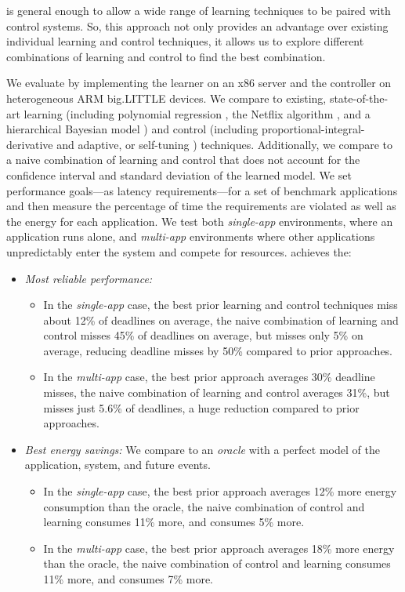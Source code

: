 \SYSTEM{} is general enough to allow a wide range of learning
techniques to be paired with control systems.  So, this approach not
only provides an advantage over existing individual learning and
control techniques, it allows us to explore different combinations of
learning and control to find the best combination.

We evaluate \SYSTEM{} by implementing the learner on an x86 server and
the controller on heterogeneous ARM big.LITTLE devices.  We compare
\SYSTEM{} to existing, state-of-the-art learning (including polynomial
regression \cite{}, the Netflix algorithm \cite{}, and a hierarchical
Bayesian model \cite{}) and control (including
proportional-integral-derivative \cite{} and adaptive, or self-tuning
\cite{}) techniques.  Additionally, we compare to a naive combination
of learning and control that does not account for the confidence
interval and standard deviation of the learned model.  We set
performance goals---as latency requirements---for a set of benchmark
applications and then measure the percentage of time the requirements
are violated as well as the energy for each application.  We test both
\emph{single-app} environments, where an application runs alone, and
\emph{multi-app} environments where other applications unpredictably
enter the system and compete for resources.  \SYSTEM{} achieves the:
\begin{itemize} 
\item \textit{Most reliable performance:} 
 \begin{itemize} 
 \item In the \emph{single-app} case, the best prior learning and
   control techniques miss about 12\% of deadlines on average, the
   naive combination of learning and control misses 45\% of deadlines
   on average, but \SYSTEM{} misses only 5\% on average, reducing
   deadline misses by 50\% compared to prior approaches.
 \item In the \emph{multi-app} case, the best prior approach averages
   30\% deadline misses, the naive combination of learning and control
   averages 31\%, but \SYSTEM{} misses just 5.6\% of deadlines, a huge
   reduction compared to prior approaches.
\end{itemize}
  \item \textit{Best energy savings:} We compare to an \emph{oracle}
    with a perfect model of the application, system, and future
    events.
    \begin{itemize}
    \item In the \emph{single-app} case, the best prior approach
      averages 12\% more energy consumption than the oracle, the naive
      combination of control and learning consumes 11\% more, and
      \SYSTEM{} consumes 5\% more.  
    \item In the \emph{multi-app} case, the best prior approach
      averages 18\% more energy than the oracle, the naive combination
      of control and learning consumes 11\% more, and \SYSTEM{}
      consumes 7\% more.
    \end{itemize}
\end{itemize}

